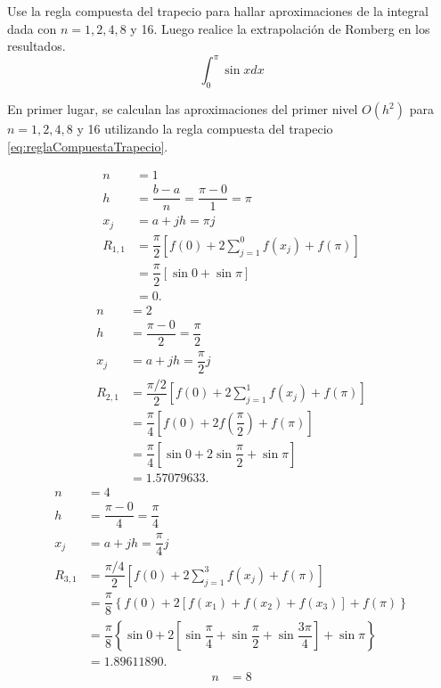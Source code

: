 \begin{exerciseT}
	Use la regla compuesta del trapecio para hallar aproximaciones de la integral dada con $n=1,2,4,8$ y 16. Luego realice la extrapolación de Romberg en los resultados.
	\[ \int_0^\pi \sin x dx \]
	
	En primer lugar, se calculan las aproximaciones del primer nivel $O(h^2)$ para $n=1,2,4,8$ y 16 utilizando la regla compuesta del trapecio \ref{eq:reglaCompuestaTrapecio}.

	\begin{align*}
		n &=1\\
		h &= \dfrac{b-a}{n} = \dfrac{\pi-0}{1} = \pi\\
		x_j &= a+jh = \pi j\\
		R_{1,1} &= \dfrac{\pi}{2}\left[f(0) + 2\sum_{j=1}^0 f(x_j) + f(\pi) \right] \\
			&= \dfrac{\pi}{2}\left[\sin 0 + \sin \pi \right]\\
			&= 0.
	\end{align*}
	\begin{align*}
		n &= 2\\
		h &= \dfrac{\pi-0}{2} = \dfrac{\pi}{2}\\
		x_j &= a+jh = \dfrac{\pi}{2}j\\
		R_{2,1} &= \dfrac{\pi/2}{2}\left[f(0) + 2\sum_{j=1}^1 f(x_j) + f(\pi) \right]\\
			&= \dfrac{\pi}{4}\left[f(0) + 2f\left(\dfrac{\pi}{2}\right) + f(\pi) \right]\\
			&= \dfrac{\pi}{4}\left[\sin 0 + 2\sin\dfrac{\pi}{2} + \sin \pi\right]\\ 
			&= 1.57079633.
	\end{align*}
	\begin{align*}
		n &= 4\\
		h &= \dfrac{\pi-0}{4} = \dfrac{\pi}{4}\\
		x_j &= a+jh = \dfrac{\pi}{4}j\\
		R_{3,1} &= \dfrac{\pi/4}{2}\left[f(0) + 2\sum_{j=1}^3 f(x_j) + f(\pi) \right]\\
			&= \dfrac{\pi}{8}\left\lbrace f(0) + 2\left[f(x_1) + f(x_2) + f(x_3) \right] + f(\pi) \right\rbrace\\
			&= \dfrac{\pi}{8}\left\lbrace \sin 0 + 2\left[\sin\dfrac{\pi}{4} + \sin\dfrac{\pi}{2} + \sin\dfrac{3\pi}{4} \right] + \sin\pi \right\rbrace\\
			&= 1.89611890.
	\end{align*}
	\begin{align*}
		n &= 8\\

\end{align*}
\end{exerciseT}
